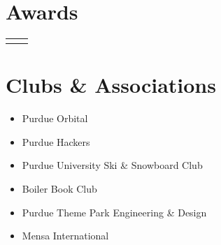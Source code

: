 \documentclass[
	10pt, %
]{FreemanCV}
\begin{document}
\begin{paracol}{2}
	\section{Awards}




	\begin{supertabular}{r l} %






	\end{supertabular}


	\section{Clubs \& Associations}

	\begin{itemize}
		\item Purdue Orbital
		\item Purdue Hackers
		\item Purdue University Ski \& Snowboard Club
		\item Boiler Book Club
		\item Purdue Theme Park Engineering \& Design
		\item Mensa International
	\end{itemize}


\end{paracol}
\end{document}
